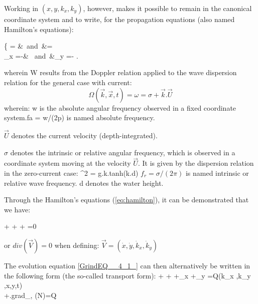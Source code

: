  Working in $(x, y, k_x, k_y)$, however, makes it possible to remain in the canonical coordinate system and to write, for the propagation equations (also named Hamilton's equations):

\bequ
\label{eq:hamilton}
\left\{
\dsp {}= &\mbox{ and }&\dsp {}= \\[12pt]
 \dsp {}_{x} =-& \mbox{ and }&\dsp {}_{y} =-
\earr
\right.
\eequ  

 wherein W results from the Doppler relation applied to the wave dispersion relation for the general case with current:
\begin{equation} \label{GrindEQ__4_3_}
\Omega (\vec{k},\vec{x},t)=\omega =\sigma +\vec{k}.\vec{U}
\end{equation}
wherein:  w is the absolute angular frequency observed in a fixed coordinate system.fa = w/(2p) is named absolute frequency.

 $\vec{U}$ denotes the current velocity (depth-integrated).

 $\sigma$ denotes the intrinsic or relative angular frequency, which is observed in a coordinate system moving at the velocity $\vec{U}$. It is given by the dispersion relation in the zero-current case:
\bequ
\label{eq:reldispersion}    
\sigma^2 = g.k.tanh(k.d) 
\eequ
$ f_r = \sigma/(2\pi)$ is named intrinsic or relative wave frequency. d denotes the water height.

 Through the Hamilton's equations (\ref{eq:hamilton}), it can be demonstrated that we have:

\bequ 
\label{eq:equ4.5.a}
 + + + =0
\eequ

or  $div(\vec{V}) = 0$   when defining: $\vec{V}=(\dot{x},\dot{y},\dot{k}_{x} ,\dot{k}_{y} )$

 The evolution equation \eqref{GrindEQ__4_1_} can then alternatively be written in the following form (the so-called transport form):
\bequ
\label{eq:transform}
\dsp
{} + + +_{x}  +_{y}  =Q(k_{x} ,k_{y} ,x,y,t)\\[6pt]
\dsp
{} +.grad_{,} (N)=Q
\earr 
\eequ

